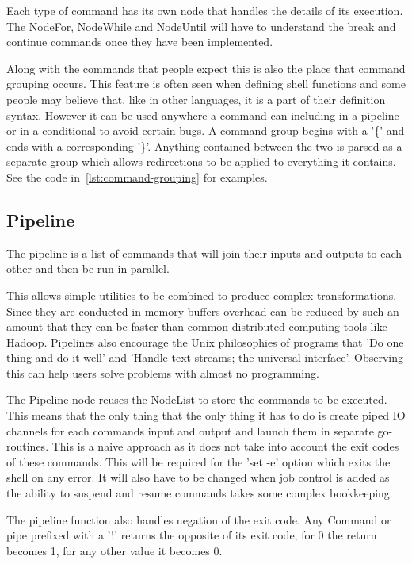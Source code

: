 Each type of command has its own node that handles the details of its execution.
The NodeFor, NodeWhile and NodeUntil will have to understand the break and continue commands once they have been implemented.

Along with the commands that people expect this is also the place that command grouping occurs.
This feature is often seen when defining shell functions and some people may believe that, like in other languages, it is a part of their definition syntax.
However it can be used anywhere a command can including in a pipeline or in a conditional to avoid certain bugs.
A command group begins with a '\{' and ends with a corresponding '\}'.
Anything contained between the two is parsed as a separate group which allows redirections to be applied to everything it contains.
See the code in~\ref{lst:command-grouping} for examples.

\subsection{Pipeline}
The pipeline is a list of commands that will join their inputs and outputs to each other and then be run in parallel.

This allows simple utilities to be combined to produce complex transformations.
Since they are conducted in memory buffers overhead can be reduced by such an amount that they can be faster than common distributed computing tools like Hadoop\cite{AdamD45:online}.
Pipelines also encourage the Unix philosophies of programs that 'Do one thing and do it well' and 'Handle text streams; the universal interface'.
Observing this can help users solve problems with almost no programming\cite{LITERATE-VS-SHELL}.

The Pipeline node reuses the NodeList to store the commands to be executed.
This means that the only thing that the only thing it has to do is create piped IO channels for each commands input and output and launch them in separate go-routines.
This is a naive approach as it does not take into account the exit codes of these commands.
This will be required for the 'set -e' option which exits the shell on any error.
It will also have to be changed when job control is added as the ability to suspend and resume commands takes some complex bookkeeping.

The pipeline function also handles negation of the exit code.
Any Command or pipe prefixed with a '!' returns the opposite of its exit code, for 0 the return becomes 1, for any other value it becomes 0.

